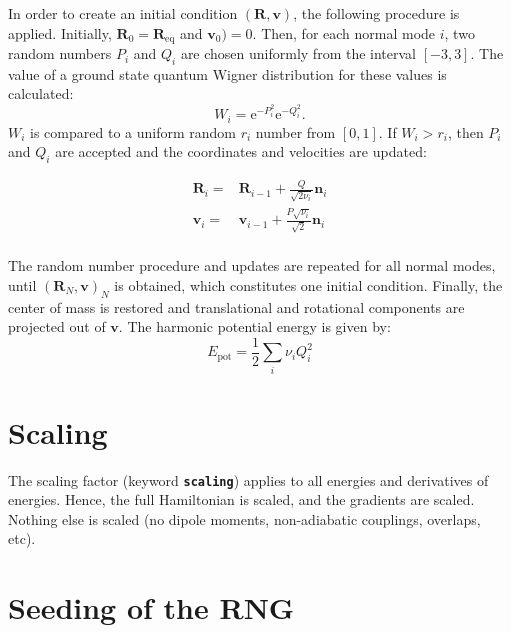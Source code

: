 \documentclass[a4paper,11pt,DIV=15,openany,twoside=false]{scrbook}
\newcommand{\ttmdump}[1]{#1}
\newcommand{\ttt}[1]{\textbf{\texttt{#1}}}
\newcommand{\E}{\ensuremath{\mathrm{e}}}
\newcommand{\VEC}[1]{\ensuremath{\mathbf{#1}}}
\begin{document}
In order to create an initial condition $(\VEC{R},\VEC{v})$, the following procedure is applied. Initially, $\VEC{R}_0=\VEC{R}_{\text{eq}}$ and $\VEC{v}_0)=0$. Then, for each normal mode $i$, two random numbers $P_i$ and $Q_i$ are chosen uniformly from the interval $[-3,3]$. The value of a ground state quantum Wigner distribution for these values is calculated:
\begin{equation}
  W_i=\E^{-P_i^2}\E^{-Q_i^2}.
\end{equation}
$W_i$ is compared to a uniform random $r_i$ number from $[0,1]$. If $W_i>r_i$, then $P_i$ and $Q_i$ are accepted and the coordinates and velocities are updated:
\ttmdump{
  \begin{align}
    \VEC{R}_i=&\VEC{R}_{i-1} + \frac{Q}{\sqrt{2\nu_i}}\VEC{n}_i\\
    \VEC{v}_i=&\VEC{v}_{i-1} + \frac{P\sqrt{\nu_i}}{\sqrt{2}}\VEC{n}_i\\
  \end{align}
}
The random number procedure and updates are repeated for all normal modes, until $(\VEC{R}_N,\VEC{v})_N$ is obtained, which constitutes one initial condition. Finally, the center of mass is restored and translational and rotational components are projected out of $\VEC{v}$. The harmonic potential energy is given by:
\begin{equation}
  E_{\text{pot}}=\frac{1}{2}\sum\limits_i \nu_iQ_i^2
\end{equation}


\section{Scaling}\label{met:scaling}

The scaling factor (keyword \ttt{scaling}) applies to all energies and derivatives of energies. Hence, the full Hamiltonian is scaled, and the gradients are scaled. Nothing else is scaled (no dipole moments, non-adiabatic couplings, overlaps, etc).


\section{Seeding of the RNG}\label{met:seed}
\end{document}
